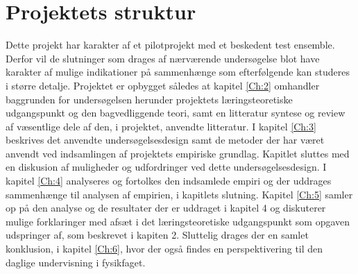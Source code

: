 \section{Projektets struktur}
\label{sec:1.3}

Dette projekt har karakter af et pilotprojekt med et beskedent test ensemble. Derfor vil de slutninger som drages af nærværende undersøgelse blot have karakter af mulige indikationer på sammenhænge som efterfølgende kan studeres i større detalje. Projektet er opbygget således at kapitel \vref{Ch:2} omhandler baggrunden for undersøgelsen herunder projektets læringsteoretiske udgangspunkt og den bagvedliggende teori, samt en litteratur syntese og review af væsentlige dele af den, i projektet, anvendte litteratur. I kapitel \vref{Ch:3} beskrives det anvendte undersøgelsesdesign samt de metoder der har været anvendt ved indsamlingen af projektets empiriske grundlag. Kapitlet sluttes med en diskusion af muligheder og udfordringer ved dette undersøgelsesdesign. I kapitel \vref{Ch:4} analyseres og fortolkes den indsamlede empiri og der uddrages sammenhænge til analysen af empirien, i kapitlets slutning. Kapitel \vref{Ch:5} samler op på den analyse og de resultater der er uddraget i kapitel 4 og diskuterer mulige forklaringer med afsæt i det læringsteoretiske udgangspunkt som opgaven udspringer af, som beskrevet i kapiten 2. Sluttelig drages der en samlet konklusion, i kapitel \vref{Ch:6}, hvor der også findes en perspektivering til den daglige undervisning i fysikfaget.
 